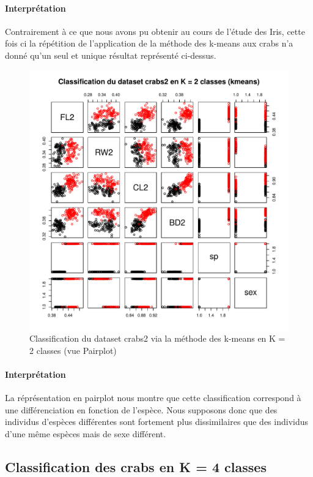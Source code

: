 \documentclass{report}
\begin{document}
\paragraph{Interprétation}
Contrairement à ce que nous avons pu obtenir au cours de l'étude des Iris, cette fois ci la répétition de l'application de la méthode des k-means aux crabs n'a donné qu'un seul et unique résultat représenté ci-dessus.
\begin{figure}[ht!]
\begin{center}
    \includegraphics[width=\textwidth]{../plots/E3Q5_2.pdf}
    \caption{Classification du dataset crabs2 via la méthode des k-means en K = 2 classes (vue Pairplot)}
\end{center}
\end{figure}
\newpage
\paragraph{Interprétation}
La réprésentation en pairplot nous montre que cette classification correspond à une différenciation en fonction de l'espèce. Nous supposons donc que des individus d'espèces différentes sont fortement plus dissimilaires que des individus d'une même espèces mais de sexe différent.
\newpage
\subsection{Classification des crabs en K = 4 classes}
\end{document}
